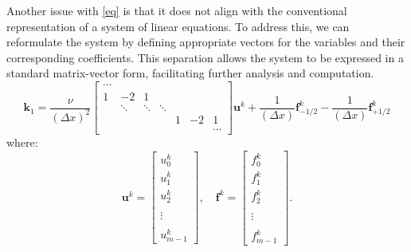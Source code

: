 Another issue with \cref{eq} is that it does not align with the conventional representation of a system of linear equations.
To address this, we can reformulate the system by defining appropriate vectors for the variables and their corresponding coefficients.
This separation allows the system to be expressed in a standard matrix-vector form, facilitating further analysis and computation.
\begin{equation}
    \label{eq:k1-systems}
    \mathbf{k}_1 = \frac{\nu }{(\Delta x)^2}\begin{bmatrix}
                                                \cdots &        &        &        &   &    &        \\
                                                1      & -2     & 1      &        &   &    &        \\
                                                & \ddots & \ddots & \ddots &   &    &        \\
                                                &        &        &        & 1 & -2 & 1      \\
                                                &        &        &        &   &    & \cdots
    \end{bmatrix}\mathbf{u}^k
    +\frac{1}{(\Delta x)}\mathbf{f}^k_{-1/2}-\frac{1}{(\Delta x)}\mathbf{f}_{+1/2}^k
\end{equation}
where:
\begin{equation}
    \label{eq:u_vec-and-f_vec-definition}
    \mathbf{u}^k = \begin{bmatrix}
                       u_0^k  \\
                       u_1^k  \\
                       u_2^k  \\
                       \\
                       \vdots\\\\
                       u_{m-1}^k
    \end{bmatrix},\quad
    \mathbf{f}^k = \begin{bmatrix}
                       f_0^k  \\
                       f_1^k  \\
                       f_2^k  \\
                       \\
                       \vdots\\\\
                       f_{m-1}^k
    \end{bmatrix}.
\end{equation}
